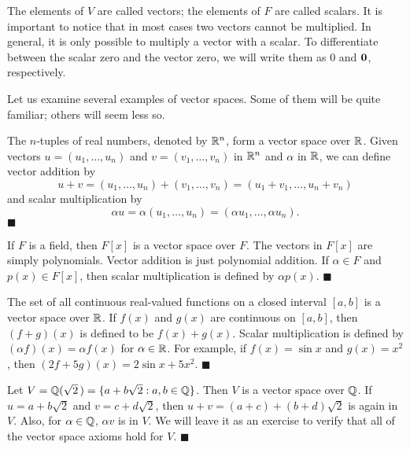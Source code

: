 The elements of $V$ are called {\bfi vectors}; the elements of $F$
are called {\bfi scalars}.  It is important to notice that in most
cases two vectors cannot be multiplied.  In general, it is only
possible to multiply a vector with a scalar. To differentiate between
the scalar zero and the vector zero, we will write them as 0 and
${\bold 0}$, respectively.  


Let us examine several examples of vector spaces. Some of them will be
quite familiar; others will seem less so.
 
 
\vspace{2 ex}

 
The $n$-tuples of real numbers, denoted by ${\Bbb R}^n$, form a vector
space over ${\Bbb R}$. Given vectors $u = (u_1, \ldots, u_n)$ and $v =
(v_1, \ldots, v_n)$ in ${\Bbb R}^n$ and $\alpha$ in ${\Bbb R}$, we can
define vector addition by
\[
u + v = (u_1, \ldots, u_n) + (v_1, \ldots, v_n)
=
(u_1 + v_1, \ldots, u_n + v_n)
\]
and scalar multiplication by 
\[
\alpha u = \alpha(u_1, \ldots, u_n)= (\alpha u_1, \ldots, \alpha u_n).
\]
\hspace{\fill} $\blacksquare$
 
 
\vspace{2 ex}
 
  
If $F$ is a field, then $F[x]$ is a vector space over $F$. The vectors
in $F[x]$ are simply polynomials.  Vector addition is just polynomial
addition. If $\alpha \in F$ and $p(x) \in F[x]$, then scalar
multiplication is defined by $\alpha p(x)$.
\hspace{\fill} $\blacksquare$
 
 
\vspace{2 ex}
 
 
The set of all continuous real-valued functions on a closed interval
$[a,b]$ is a vector space over ${\Bbb R}$.  If $f(x)$ and $g(x)$ are
continuous on $[a, b]$, then $(f+g)(x)$ is defined to be $f(x) +
g(x)$.  Scalar multiplication is defined by
$(\alpha f)(x) = \alpha f(x)$ for $\alpha \in 
{\Bbb R}$. For example, if $f(x) = \sin x$ and $g(x)= x^2$, then 
$(2f+5g)(x) =2 \sin x + 5 x^2$. 
\hspace{\fill} $\blacksquare$
 

\vspace{2 ex}
 
 
Let $V = {\Bbb Q}(\sqrt{2}\, ) = \{ a + b \sqrt{2} : a, b \in 
{\Bbb Q } \}$. Then $V$ is a
vector space over ${\Bbb Q}$. If $u = a + b \sqrt{2}$ and $v = c + d
\sqrt{2}$, then $u + v = (a + c) + (b + d ) \sqrt{2}$ is again in $V$.
Also, for $\alpha \in {\Bbb Q}$, $\alpha v$ is in $V$.  We will leave
it as an exercise to verify that all of the vector space axioms hold
for $V$. 
\hspace{\fill} $\blacksquare$

